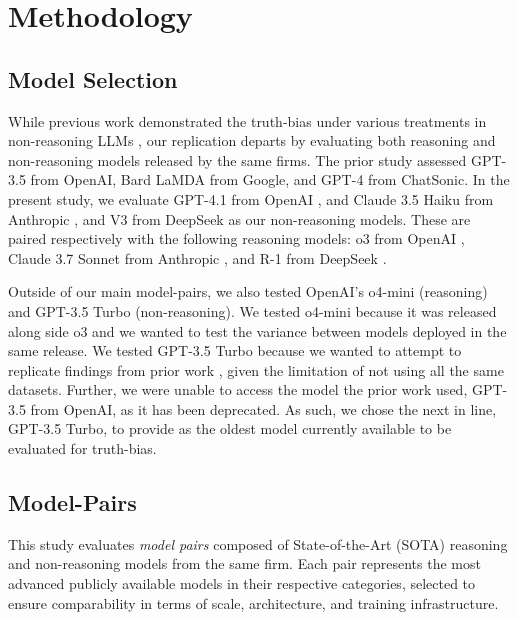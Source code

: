 \documentclass{article}
\begin{document}
\section{Methodology}
\label{sec:methodology}

\subsection{Model Selection}

While previous work demonstrated the truth-bias under various treatments in non-reasoning LLMs \citep{markowitz_generative_2024}, our replication departs by evaluating both reasoning and non-reasoning models released by the same firms. The prior study assessed GPT-3.5 from OpenAI, Bard LaMDA from Google, and GPT-4 from ChatSonic. In the present study, we evaluate GPT-4.1 from OpenAI \citep{OpenAI_4-1_API_2025}, and Claude 3.5 Haiku from Anthropic \citep{anthropic_claude_2024}, and V3 from DeepSeek \citep{deepseekai2025deepseekv3technicalreport} as our non-reasoning models. These are paired respectively with the following reasoning models: o3 from OpenAI \citep{openai_o3_o4m_systemcard2024}, Claude 3.7 Sonnet from Anthropic \citep{anthropic_claude_2025}, and R-1 from DeepSeek \citep{deepseek-ai_deepseek-r1_2025}.

Outside of our main model-pairs, we also tested OpenAI's o4-mini (reasoning) and GPT-3.5 Turbo (non-reasoning). We tested o4-mini because it was released along side o3 and we wanted to test the variance between models deployed in the same release. We tested GPT-3.5 Turbo because we wanted to attempt to replicate findings from prior work \citep{markowitz_generative_2024}, given the limitation of not using all the same datasets. Further, we were unable to access the model the prior work used, GPT-3.5 from OpenAI, as it has been deprecated. As such, we chose the next in line, GPT-3.5 Turbo, to provide as the oldest model currently available to be evaluated for truth-bias.

\subsection{Model-Pairs}

This study evaluates \textit{model pairs} composed of State-of-the-Art (SOTA) reasoning and non-reasoning models from the same firm. Each pair represents the most advanced publicly available models in their respective categories, selected to ensure comparability in terms of scale, architecture, and training infrastructure.
\end{document}
